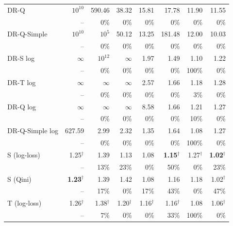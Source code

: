 \begin{tabular}{l|rrrrrrr}
DR-Q & $10^{10}$ & 590.46 & 38.32 & 15.81 & 17.78 & 11.90 & 11.55 \\
 & \scriptsize -- & \scriptsize 0\% & \scriptsize 0\% & \scriptsize 0\% & \scriptsize 0\% & \scriptsize 0\% & \scriptsize 0\% \\[2pt]
DR-Q-Simple & $10^{10}$ & $10^{5}$ & 50.12 & 13.25 & 181.48 & 12.00 & 10.03 \\
 & \scriptsize -- & \scriptsize 0\% & \scriptsize 0\% & \scriptsize 0\% & \scriptsize 0\% & \scriptsize 0\% & \scriptsize 0\% \\[2pt]
\hline
DR-S log & $\infty$ & $10^{12}$ & $\infty$ & 1.97 & 1.49 & 1.10 & 1.22 \\
 & \scriptsize -- & \scriptsize 0\% & \scriptsize 0\% & \scriptsize 0\% & \scriptsize 0\% & \scriptsize 100\% & \scriptsize 0\% \\[2pt]
DR-T log & $\infty$ & $\infty$ & $\infty$ & 2.57 & 1.66 & 1.18 & 1.28 \\
 & \scriptsize -- & \scriptsize 0\% & \scriptsize 0\% & \scriptsize 0\% & \scriptsize 0\% & \scriptsize 3\% & \scriptsize 0\% \\[2pt]
DR-Q log & $\infty$ & $\infty$ & $\infty$ & 8.58 & 1.66 & 1.21 & 1.27 \\
 & \scriptsize -- & \scriptsize 0\% & \scriptsize 0\% & \scriptsize 0\% & \scriptsize 0\% & \scriptsize 10\% & \scriptsize 0\% \\[2pt]
DR-Q-Simple log & 627.59 & 2.99 & 2.32 & 1.35 & 1.64 & 1.08 & 1.27 \\
 & \scriptsize -- & \scriptsize 0\% & \scriptsize 0\% & \scriptsize 0\% & \scriptsize 0\% & \scriptsize 100\% & \scriptsize 0\% \\[2pt]
\hline
S (log-loss) & 1.25$^\dagger$ & 1.39 & 1.13 & 1.08 & \textbf{1.15}$^\dagger$ & 1.27$^\dagger$ & \textbf{1.02}$^\dagger$ \\
 & \scriptsize -- & \scriptsize 13\% & \scriptsize 23\% & \scriptsize 0\% & \scriptsize 50\% & \scriptsize 0\% & \scriptsize 23\% \\[2pt]
S (Qini) & \textbf{1.23}$^\dagger$ & 1.39 & 1.42 & 1.08 & 1.16 & 1.18 & 1.02$^\dagger$ \\
 & \scriptsize -- & \scriptsize 17\% & \scriptsize 0\% & \scriptsize 17\% & \scriptsize 43\% & \scriptsize 0\% & \scriptsize 47\% \\[2pt]
T (log-loss) & 1.26$^\dagger$ & 1.38$^\dagger$ & 1.20$^\dagger$ & 1.16$^\dagger$ & 1.16$^\dagger$ & 1.08 & 1.06$^\dagger$ \\
 & \scriptsize -- & \scriptsize 7\% & \scriptsize 0\% & \scriptsize 0\% & \scriptsize 33\% & \scriptsize 100\% & \scriptsize 0\% \\[2pt]

\end{tabular}
